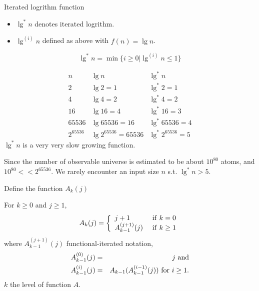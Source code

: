 \documentclass{beamer}
\begin{document}
\begin{frame}{}

\centerline{\large Iterated logrithm function}
\begin{itemize}
\item $\lg ^*n$ denotes iterated logrithm.
\item $\lg^{(i)}n$ defined as above with $f(n)=\lg n$. 
\end{itemize}
\begin{equation}
\lg^* n = \min \{ i\ge 0| \lg^{(i)}n \le 1\}
\end{equation}
\end{frame}

\begin{frame}{}

$$
\begin{array}{rrr}
n & \lg n & \lg ^*n \\
2 & \lg 2 = 1 & \lg^*2 = 1 \\
4 & \lg 4 = 2 & \lg^*4 = 2 \\
16 & \lg 16 = 4 & \lg ^* 16 = 3\\
65536 & \lg 65536 = 16 & \lg ^* 65536 = 4\\
2^{65536} & \lg 2^{65536} = 65536 & \lg^* 2^{65536} = 5
\end{array}
$$
$\lg ^*n$ is a very very slow growing function. 

Since the number of observable universe is estimated to be about $10^{80}$
atoms, and $10^{80}<< 2^{65536}$. We rarely encounter an input size $n$
s.t. $\lg^*n>5$. 
\end{frame}

\begin{frame}{}

\centerline{\large Define the function $A_k(j)$}
For $k\ge0$ and $j\ge 1$,
\begin{equation}
A_k(j) = \left \{
\begin{array}{ll}
j+1 & {\rm \ if \ } k=0 \\
A_{k-1}^{(j+1)}(j) & {\rm \ if \ } k\ge 1
\end{array}
\right.
\end{equation}
where $A_{k-1}^{(j+1)}(j)$ functional-iterated notation,
\begin{eqnarray}
A_{k-1}^{(0)}(j) &=& j {\rm \ and}\\
A_{k-1}^{(i)}(j) &=& A_{k-1}(A_{k-1}^{(i-1)}(j)) {\rm \ for\ } i\ge 1.
\end{eqnarray}
$k$ the level of function $A$. 
\end{frame}
\end{document}
